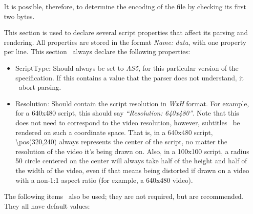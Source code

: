 \documentclass{spec}
\begin{document}
It is possible, therefore, to determine the encoding of the file by checking its first two bytes.

This section is used to declare several script properties that affect its parsing and rendering.
All properties are stored in the format \textit{Name: data}, with one property per line. 
This section \must\ always declare the following properties:

\begin{itemize}
\item ScriptType: Should always be set to \textit{AS5}, for this particular version of the specification.
If this contains a value that the parser does not understand, it \must\ abort parsing.
\item Resolution: Should contain the script resolution in \textit{WxH} format. For example, for a 640x480
script, this should say \textit{``Resolution: 640x480''}. Note that this does not need to correspond to the
video resolution, however, subtitles \must\ be rendered on such a coordinate space. That is, in a
640x480 script, \textbackslash{pos(320,240)} always represents the center of the script, no matter the
resolution of the video it's being drawn on. Also, in a 100x100 script, a radius 50 circle centered on
the center will always take half of the height and half of the width of the video, even if that means
being distorted if drawn on a video with a non-1:1 aspect ratio (for example, a 640x480 video).
\end{itemize}

The following items \may\ also be used; they are not required, but are recommended. They all have default values:
\end{document}
